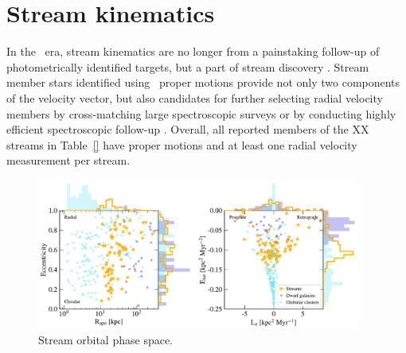 \documentclass[final,5p,times,twocolumn,authoryear]{elsarticle}
\begin{document}



\section{Stream kinematics}
\label{sec:orbits}
In the \gaia\ era, stream kinematics are no longer from a painstaking follow-up of photometrically identified targets, but a part of stream discovery \citep[e.g.,][]{malhan:2018b, malhan:2019, ibata:2018, ibata:2019, ibata:2021, grillmair:2019, grillmair:2022}.
Stream member stars identified using \gaia\ proper motions provide not only two components of the velocity vector, but also candidates for further selecting radial velocity members by cross-matching large spectroscopic surveys \citep[e.g.,][]{huang:2019, yang:2022, ibata:2023} or by conducting highly efficient spectroscopic follow-up \citep[e.g.,][]{li:2019, bonaca:2020b}.
Overall, all reported members of the XX streams in Table~\ref{} have proper motions and at least one radial velocity measurement per stream.

\begin{figure}
\begin{center}
\includegraphics[width=0.95\textwidth]{figures/orbital_phase_space.pdf}
\end{center}
\caption{%
Stream orbital phase space.
\label{fig:phase_space}
}
\end{figure}
\end{document}
